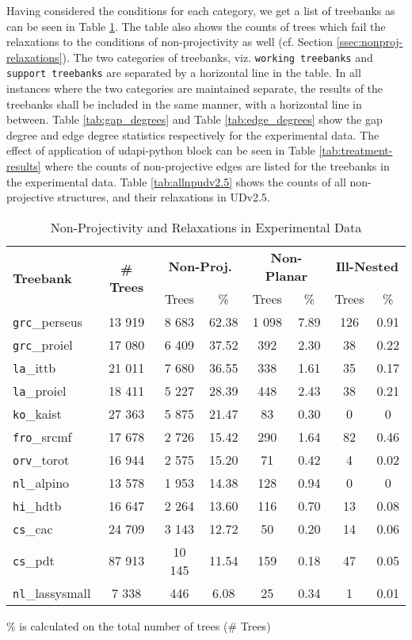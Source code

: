 Having considered the conditions for each category, we get a list of treebanks as can be seen in Table \ref{tab:nonproj_dataset}. The table also shows the counts of trees which fail the relaxations to the conditions of non-projectivity as well (cf. Section \ref{ssec:nonproj-relaxations}). The two categories of treebanks, viz. \texttt{working treebanks} and \texttt{support treebanks} are separated by a horizontal line in the table. In all instances where the two categories are maintained separate, the results of the treebanks shall be included in the same manner, with a horizontal line in between. Table \ref{tab:gap_degrees} and Table \ref{tab:edge_degrees} show the gap degree and edge degree statistics respectively for the experimental data. The effect of application of udapi-python block can be seen in Table \ref{tab:treatment-results} where the counts of non-projective edges are listed for the treebanks in the experimental data. Table \ref{tab:allnpudv2.5} shows the counts of all non-projective structures, and their relaxations in UDv2.5. 

\begin{table}[H]
    \centering
    \begin{tabular}{|l|c|c|c|c|c|c|c|}
    \hline
    \multirow{2}{*}{\textbf{Treebank}} &
    \multirow{2}{*}{\textbf{\# Trees}} & 
    \multicolumn{2}{c|}{\textbf{Non-Proj.}} & 
    \multicolumn{2}{c|}{\textbf{Non-Planar}} & 
    \multicolumn{2}{c|}{\textbf{Ill-Nested}} \\
    & & Trees & \% & Trees & \% & Trees & \% \\
    \hline
    \hline
    \texttt{grc}\_perseus & 13 919 & 8 683 & 62.38 & 1 098 & 7.89 & 126 & 0.91\\
    \texttt{grc}\_proiel & 17 080 & 6 409 & 37.52 & 392 & 2.30 & 38 & 0.22\\
    \texttt{la}\_ittb & 21 011 & 7 680 & 36.55 & 338 & 1.61 & 35 & 0.17\\
    \texttt{la}\_proiel & 18 411 & 5 227 & 28.39 & 448 & 2.43 & 38 & 0.21\\
    \texttt{ko}\_kaist & 27 363 & 5 875 & 21.47 & 83 & 0.30 & 0 & 0\\
    \texttt{fro}\_srcmf & 17 678 & 2 726 & 15.42 & 290 & 1.64 & 82 & 0.46\\
    \texttt{orv}\_torot & 16 944 & 2 575 & 15.20 & 71 & 0.42 & 4 & 0.02\\
    \texttt{nl}\_alpino & 13 578 & 1 953 & 14.38 & 128 & 0.94 & 0 & 0\\
    \texttt{hi}\_hdtb & 16 647 & 2 264 & 13.60 & 116 & 0.70 & 13 & 0.08\\
    \texttt{cs}\_cac & 24 709 & 3 143 & 12.72 & 50 & 0.20 & 14 & 0.06\\
    \hline
    \texttt{cs}\_pdt & 87 913 & 10 145 & 11.54 & 159 & 0.18 & 47 & 0.05\\
    \texttt{nl}\_lassysmall & 7 338 & 446 & 6.08 & 25 & 0.34 & 1 & 0.01\\
    \hline
    \end{tabular}
    \caption{Non-Projectivity and Relaxations in Experimental Data}\% is calculated on the total number of trees (\# Trees)
    \label{tab:nonproj_dataset}
\end{table}

